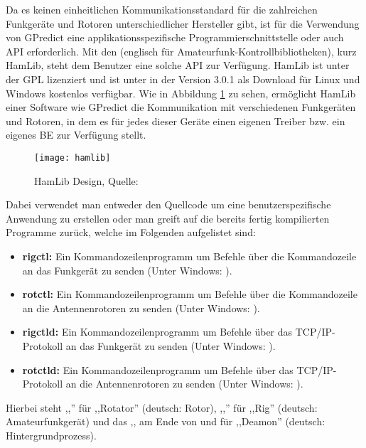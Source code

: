 Da es keinen einheitlichen Kommunikationsstandard für die zahlreichen Funkgeräte und Rotoren unterschiedlicher Hersteller gibt, ist für die Verwendung von GPredict eine applikationsspezifische Programmierschnittstelle oder auch \ac{API} erforderlich. Mit den  (englisch für Amateurfunk-Kontrollbibliotheken), kurz HamLib, steht dem Benutzer eine solche \ac{API} zur Verfügung. HamLib ist unter der \ac{GPL} lizenziert und ist unter \cite{hamlibdownload} in der Version 3.0.1 als Download für Linux und Windows kostenlos verfügbar. Wie in Abbildung \ref{fig:hamlib} zu sehen, ermöglicht HamLib einer Software wie GPredict die Kommunikation mit verschiedenen Funkgeräten und Rotoren, in dem es für jedes dieser Geräte einen eigenen Treiber bzw. ein eigenes \ac{BE} zur Verfügung stellt.

\begin{figure}[h]
	\centering
	\texttt{[image: hamlib]}
	\caption[HamLib Design]{HamLib Design, Quelle: \cite{hamlibmanual}}
	\label{fig:hamlib}
\end{figure}

Dabei verwendet man entweder den Quellcode um eine benutzerspezifische Anwendung zu erstellen oder man greift auf die bereits fertig kompilierten Programme zurück, welche im Folgenden aufgelistet sind:

\begin{itemize}
	\parskip0pt
	\item \textbf{rigctl:} Ein Kommandozeilenprogramm um Befehle über die Kommandozeile an das Funkgerät zu senden (Unter Windows: ).
	\item \textbf{rotctl:} Ein Kommandozeilenprogramm um Befehle über die Kommandozeile an die Antennenrotoren zu senden (Unter Windows: ).
	\item \textbf{rigctld:} Ein Kommandozeilenprogramm um Befehle über das TCP/IP-Protokoll an das Funkgerät zu senden (Unter Windows: ).
	\item \textbf{rotctld:}  Ein Kommandozeilenprogramm um Befehle über das TCP/IP-Protokoll an die Antennenrotoren zu senden (Unter Windows: ).
\end{itemize}

Hierbei steht ,,'' für ,,Rotator'' (deutsch: Rotor), ,,'' für  ,,Rig'' (deutsch: Amateurfunkgerät) und das ,, am Ende von  und  für ,,Deamon'' (deutsch: Hintergrundprozess).


